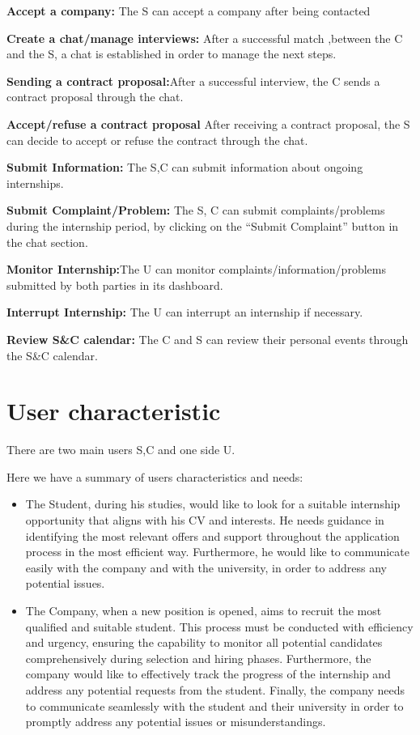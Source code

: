 \textbf{Accept a company:} The S can accept a company after being
contacted

\textbf{Create a chat/manage interviews:} After a successful match
,between the C and the S, a chat is established in order to manage the
next steps.

\textbf{Sending a contract proposal:}After a successful interview, the C
sends a contract proposal through the chat.~

\textbf{Accept/refuse a contract proposal} After receiving a contract
proposal, the S can decide to accept or refuse the contract through the
chat.

\textbf{Submit Information:} The S,C can submit information about
ongoing internships.

\textbf{Submit Complaint/Problem:} The S, C can submit
complaints/problems during the internship period, by clicking on the
``Submit Complaint'' button in the chat section.

\textbf{Monitor Internship:}The U can monitor
complaints/information/problems submitted by both parties in its
dashboard.

\textbf{Interrupt Internship:} The U can interrupt an internship if
necessary.

\textbf{Review S\&C calendar:} The C and S can review their personal
events through the S\&C calendar.

\section{User characteristic}
\label{sec:User_characteristic}%

There are two main users S,C and one side U.

Here we have a summary of users characteristics and needs:

\begin{itemize}
\item
  The Student, during his studies, would like to look for a suitable
  internship opportunity that aligns with his CV and interests. He needs
  guidance in identifying the most relevant offers and support
  throughout the application process in the most efficient way.
  Furthermore, he would like to communicate easily with the company and
  with the university, in order to address any potential issues.
\end{itemize}

\begin{itemize}
\item
  The Company, when a new position is opened, aims to recruit the most
  qualified and suitable student. This process must be conducted with
  efficiency and urgency, ensuring the capability to monitor all
  potential candidates comprehensively during selection and hiring
  phases. Furthermore, the company would like to effectively track the
  progress of the internship and address any potential requests from the
  student. Finally, the company needs to communicate seamlessly with the
  student and their university in order to promptly address any
  potential issues or misunderstandings.
\end{itemize}

